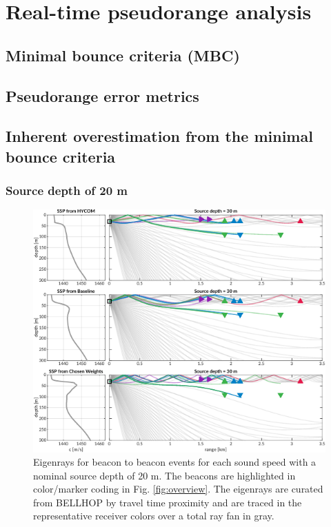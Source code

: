 \clearpage
\section{\label{sec:realtime} Real-time pseudorange analysis}

\subsection{Minimal bounce criteria (MBC)}

\subsection{Pseudorange error metrics}

\subsection{Inherent overestimation from the minimal bounce criteria}

\subsubsection{Source depth of 20 m}
\begin{figure}[h!]
  \centering
  \includegraphics[width=\reprintcolumnwidth]{figs/Fig4.pdf}
  \caption{Eigenrays for beacon to beacon events for each sound speed with a nominal source depth of 20 m. The beacons are highlighted in color/marker coding in Fig. \ref{fig:overview}. The eigenrays are curated from BELLHOP by travel time proximity and are traced in the representative receiver colors over a total ray fan in gray.}
  \label{fig:raytrace-zs20}
\end{figure}


